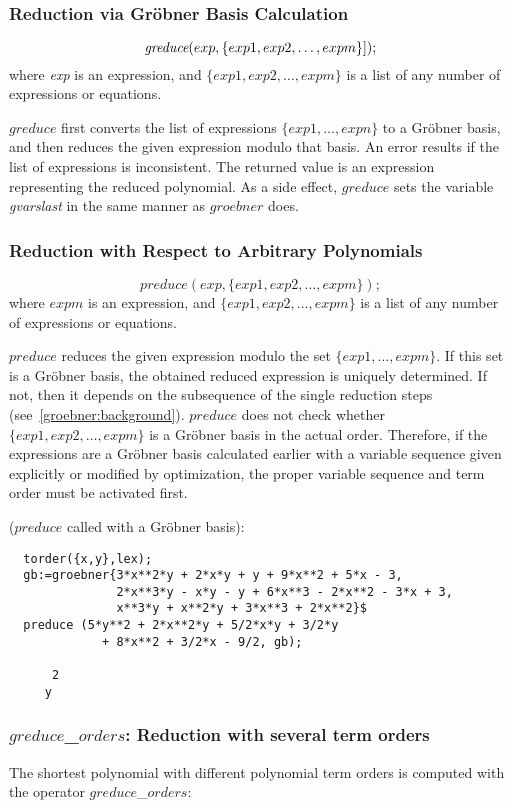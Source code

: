 \subsubsection{Reduction via Gr\"obner Basis Calculation}
\[
\mbox{\it greduce}(exp, \{exp1, exp2, \ldots , expm\}]);
\]
where {\it exp} is an expression, and $\{exp1, exp2,\ldots , expm\}$ is
a list of any number of expressions or equations.

$greduce$ first converts the list of expressions $\{exp1, \ldots ,
expn\}$ to a Gr\"obner basis, and then reduces the given expression
modulo that basis.  An error results if the list of expressions is
inconsistent. The returned value is an expression representing the
reduced polynomial. As a side effect, $greduce$ sets the variable {\it
gvarslast} in the same manner as $groebner$ does.

\subsubsection{Reduction with Respect to Arbitrary Polynomials}
\[
 preduce(exp, \{exp1, exp2,\ldots , expm\});
\]
where $ expm $  is an expression, and $\{exp1, exp2, \ldots ,
expm \}$ is a list of any number of expressions or equations.

$preduce$ reduces the given expression modulo the set $\{exp1,
\ldots , expm\}$. If this set is a Gr\"obner basis, the obtained reduced
expression is uniquely determined. If not, then it depends on the
subsequence of the single reduction steps
(see~\ref{groebner:background}). $preduce$ does not check whether
$\{exp1, exp2, \ldots , expm\}$ is a Gr\"obner basis in the actual
order. Therefore, if the expressions are a Gr\"obner basis calculated
earlier with a variable sequence given explicitly or modified by
optimization, the proper variable sequence and term order must
be activated first.

\example ($preduce$ called with a Gr\"obner basis):
\begin{verbatim}
  torder({x,y},lex);
  gb:=groebner{3*x**2*y + 2*x*y + y + 9*x**2 + 5*x - 3,
               2*x**3*y - x*y - y + 6*x**3 - 2*x**2 - 3*x + 3,
               x**3*y + x**2*y + 3*x**3 + 2*x**2}$
  preduce (5*y**2 + 2*x**2*y + 5/2*x*y + 3/2*y
             + 8*x**2 + 3/2*x - 9/2, gb);

      2
     y
\end{verbatim}

\subsubsection{$greduce$\_$orders$: Reduction with several term orders}
The shortest polynomial with different polynomial term orders is computed
with the operator $greduce$\_$orders$:
 
